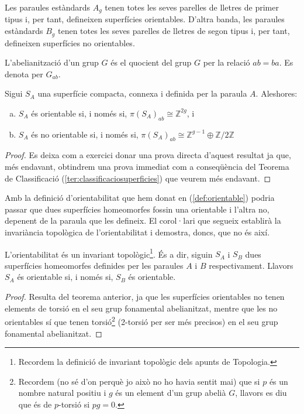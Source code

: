 \documentclass[../main.tex]{subfiles}
\begin{document}
\begin{ej}
Les paraules estàndards $A_g$ tenen totes les seves parelles de lletres de primer tipus i, per tant, defineixen superfícies orientables. D'altra banda, les paraules estàndards $B_g$ tenen totes les seves parelles de lletres de segon tipus i, per tant, defineixen superfícies no orientables.
\end{ej}

L'abelianització d'un grup $G$ és el quocient del grup $G$ per la relació $ab=ba$. Es denota per $G_{ab}$.

\begin{ter}
\label{ter:grupfonamentalsuperficieorientable} Sigui $S_A$ una superfície compacta, connexa i definida per la paraula $A$. Aleshores:
\begin{enumerate}[(a)]
    \item $S_A$ és orientable si, i només si, $\pi(S_A)_{ab}\cong \mathbb{Z}^{2g}$, i
    \item $S_A$ és no orientable si, i només si, $\pi(S_A)_{ab}\cong\mathbb{Z}^{g-1}\oplus \mathbb{Z}/2\mathbb{Z}$
\end{enumerate}
\end{ter}
\begin{proof}
Es deixa com a exercici donar una prova directa d'aquest resultat ja que, més endavant, obtindrem una prova immediat com a conseqüència del Teorema de Classificació (\ref{ter:classificaciosuperficies}) que veurem més endavant.
\end{proof}

Amb la definició d'orientabilitat que hem donat en (\ref{def:orientable}) podria passar que dues superfícies homeomorfes fossin una orientable i l'altra no, depenent de la paraula que les defineix. El corol·lari que segueix establirà la invariància topològica de l'orientabilitat i demostra, doncs, que no és així.

\begin{coro}
\label{coro:orientabilitatesuninvarianttopologic} L'orientabilitat és un invariant topològic\footnote{Recordem la definició de invariant topològic dels apunts de Topologia.}. És a dir, siguin $S_A$ i $S_B$ dues superfícies homeomorfes definides per les paraules $A$ i $B$ respectivament. Llavors $S_A$ és orientable si, i només si, $S_B$ és orientable.
\end{coro}
\begin{proof}
Resulta del teorema anterior, ja que les superfícies orientables no tenen elements de torsió en el seu grup fonamental abelianitzat, mentre que les no orientables sí que tenen torsió\footnote{Recordem (no sé d'on perquè jo això no ho havia sentit mai) que si $p$ és un nombre natural positiu i $g$ és un element d'un grup abelià $G$, llavors es diu que és de $p$-torsió si $pg=0$.} (2-torsió per ser més precisos) en el seu grup fonamental abelianitzat.
\end{proof}
\end{document}
